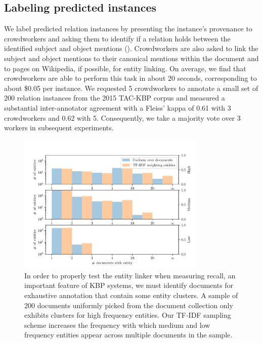 \subsection{Labeling predicted instances}
We label predicted relation instances by presenting the instance's provenance to crowdworkers
  and asking them to identify if a relation holds between the identified subject and object mentions (). 
  Crowdworkers are also asked to link the subject and object mentions to their canonical mentions within the document and to pages on Wikipedia, if possible, for entity linking.
On average, we find that crowdworkers are able to perform this task in about 20 seconds, corresponding to about \$0.05 per instance.
We requested 5 crowdworkers to annotate a small set of 200 relation instances from the 2015 TAC-KBP corpus 
and measured a substantial inter-annotator agreement with a Fleiss' kappa of 0.61 with 3 crowdworkers and 0.62 with 5. %
Consequently, we take a majority vote over 3 workers in subsequent experiments.

\begin{figure}[t]
  \centering
  \includegraphics[width=0.8\textwidth]{figures/analysis/exhaustive_entity_cross}
  \caption[Comparison of document sampling distributions]{\label{fig:kbpo:exhaustive-entity}
  In order to properly test the entity linker when measuring recall, an important feature of KBP systems, we must identify documents for exhaustive annotation that contain some entity clusters.
  A sample of 200 documents uniformly picked from the document collection only exhibits clusters for high frequency entities.
  Our TF-IDF sampling scheme increases the frequency with which medium and low frequency entities appear across multiple documents in the sample.
  }
\end{figure}

